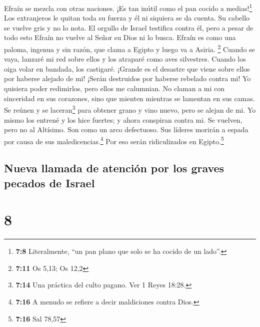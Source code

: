  Efraín se mezcla con otras naciones. ¡Es tan inútil como
el pan cocido a medias!\footnote{\textbf{7:8} Literalmente, ``un pan
  plano que solo se ha cocido de un lado''.}  Los
extranjeros le quitan toda su fuerza y él ni siquiera se da cuenta. Su
cabello se vuelve gris y no lo nota.  El orgullo de
Israel testifica contra él, pero a pesar de todo esto Efraín no vuelve
al Señor su Dios ni lo busca.  Efraín es como una paloma,
ingenua y sin razón, que clama a Egipto y luego va a Asiria. \footnote{\textbf{7:11}
  Os 5,13; Os 12,2}  Cuando se vaya, lanzaré mi red sobre
ellos y los atraparé como aves silvestres. Cuando los oiga volar en
bandada, los castigaré.  ¡Grande es el desastre que viene
sobre ellos por haberse alejado de mi! ¡Serán destruidos por haberse
rebelado contra mi! Yo quisiera poder redimirlos, pero ellos me
calumnian.  No claman a mi con sinceridad en sus
corazones, sino que mienten mientras se lamentan en sus camas. Se reúnen
y se laceran\footnote{\textbf{7:14} Una práctica del culto pagano. Ver 1
  Reyes 18:28.} para obtener grano y vino nuevo, pero se alejan de mi.
 Yo mismo los entrené y los hice fuertes; y ahora
conspiran contra mi.  Se vuelven, pero no al Altísimo.
Son como un arco defectuoso. Sus líderes morirán a espada por causa de
sus maledicencias.\footnote{\textbf{7:16} A menudo se refiere a decir
  maldiciones contra Dios.} Por eso serán ridiculizados en
Egipto.\footnote{\textbf{7:16} Sal 78,57}

\hypertarget{nueva-llamada-de-atenciuxf3n-por-los-graves-pecados-de-israel}{%
\subsection{Nueva llamada de atención por los graves pecados de
Israel}\label{nueva-llamada-de-atenciuxf3n-por-los-graves-pecados-de-israel}}

\hypertarget{section-7}{%
\section{8}\label{section-7}}

